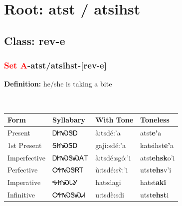 \needspace{4in}
\section*{Root: atst / atsihst}
\nopagebreak
{}
\needspace{3in}
\subsection*{Class: rev-e}
\nopagebreak
\needspace{2in}
\subsubsection*{\textcolor{Red}{Set A}{-}\textbf{atst/atsihst}{-}[rev-e]}
\nopagebreak
\textbf{Definition: } he/she is taking a bite
\\[0.5em]
\begin{tabularx}{\textwidth}{l X X X}%
\toprule%
\textbf{Form}&\textbf{Syllabary}&\textbf{With Tone}&\textbf{Toneless}\\%
\midrule%
Present&ᎠᏥᏍᏕᎠ&à:tsdé:’a&atst\textbf{e'}a\\%
1st Present&ᎦᏥᏍᏕᎠ&gajì:sdé:’a&katsihst\textbf{e'}a\\%
Imperfective&ᎠᏥᏍᏕᏍᎪᎢ&à:tsdé:sgó:’i&atst\textbf{ehsk}o'i\\%
Perfective&ᎤᏥᏍᏕᏒᎢ&ù:tsdé:sv̌:’i&utst\textbf{ehs}v'i\\%
Imperative&ᎭᏥᏍᏓᎩ&hatsdagi&hatst\textbf{aki}\\%
Infinitive&ᎤᏥᏍᏕᏍᏗ&u:tsdè:sdi&utst\textbf{ehst}i\\%
\bottomrule%
\end{tabularx}
\\[1em]
